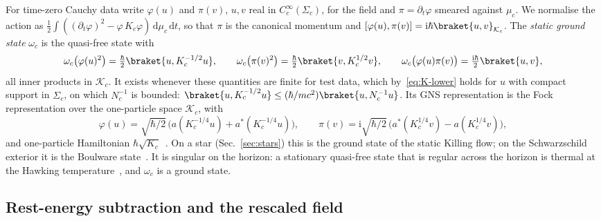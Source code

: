 \documentclass[%
 aip,
 jmp,
 amsmath,amssymb,
 reprint, onecolumn
]{revtex4-1}
\theoremstyle{definition}
\theoremstyle{remark}
\newcommand{\K}{\mathcal{K}}
\newcommand{\rmd}{\mathrm{d}}
\newcommand{\rmi}{\mathrm{i}}
\begin{document}
For time-zero Cauchy data write $\varphi(u)$ and $\pi(v)$, $u,v$ real in
$C_c^\infty(\Sigma_c)$, for the field and $\pi=\partial_t\varphi$ smeared
against $\mu_c$. We normalise the action as $\frac12\int((\partial_t
\varphi)^2-\varphi\,K_c\varphi)\,\rmd\mu_c\,\rmd t$, so that $\pi$ is the
canonical momentum and $[\varphi(u),\pi(v)]=\rmi\hbar\braket{u,v}_{\K_c}$.
The \emph{static ground state} $\omega_c$ is the quasi-free state with
\begin{equation}\label{eq:ground-state}
\omega_c\bigl(\varphi(u)^2\bigr)=\tfrac{\hbar}{2}\braket{u,K_c^{-1/2}u},
\qquad
\omega_c\bigl(\pi(v)^2\bigr)=\tfrac{\hbar}{2}\braket{v,K_c^{1/2}v},
\qquad
\omega_c\bigl(\varphi(u)\pi(v)\bigr)=\tfrac{\rmi\hbar}{2}\braket{u,v},
\end{equation}
all inner products in $\K_c$. It exists whenever these quantities are
finite for test data, which by~\eqref{eq:K-lower} holds for $u$ with
compact support in $\Sigma_c$, on which $N_c^{-1}$ is bounded:
$\braket{u,K_c^{-1/2}u}\leq(\hbar/mc^2)\braket{u,N_c^{-1}u}$.
Its GNS representation is the Fock representation over the one-particle
space $\K_c$, with
\[
\varphi(u)=\sqrt{\hbar/2}\,\bigl(a(K_c^{-1/4}u)+a^*(K_c^{-1/4}u)\bigr),\qquad
\pi(v)=\rmi\sqrt{\hbar/2}\,\bigl(a^*(K_c^{1/4}v)-a(K_c^{1/4}v)\bigr),
\]
and one-particle Hamiltonian $\hbar\sqrt{K_c}$~\cite{Kay1978}. On a
star (Sec.~\ref{sec:stars}) this is the ground state of the static
Killing flow; on the Schwarzschild exterior it is the Boulware
state~\cite{Boulware1975}. It is singular on the horizon: a stationary
quasi-free state that is regular across the horizon is thermal at the
Hawking temperature~\cite{KayWald1991}, and $\omega_c$ is a ground state.

\subsection{Rest-energy subtraction and the rescaled field}
\label{sec:rescaled-field}
\end{document}
